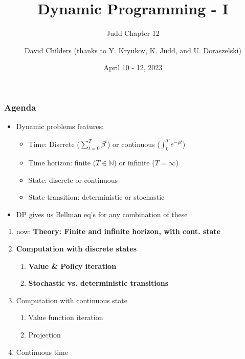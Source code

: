 \documentclass[bigger,handout]{beamer}
\begin{document}
\title[47-809: Dyn.Prog.]{Dynamic Programming - I}
\subtitle{Judd Chapter 12}
\author[David Childers]{David Childers (thanks to Y. Kryukov, K. Judd, and U. Doraszelski)}
\date[Apr 10-12]{April 10 - 12, 2023}
\maketitle



\begin{frame}%

\frametitle{Agenda}

\begin{itemize}
\item Dynamic problems features:

\begin{itemize}
\item Time: Discrete ($\sum_{t=0}^{T}\beta ^{t}$) or continuous ($%
\int_{0}^{T}e^{-\rho t}$)

\item Time horizon: finite ($T\in \mathbb{N}$) or infinite ($T=\infty $)

\item State: discrete or continuous

\item State transition: deterministic or stochastic
\end{itemize}

\item DP gives us Bellman eq's for any combination of these
\end{itemize}

\begin{enumerate}
\item now: \textbf{Theory: Finite and infinite horizon, with cont. state}

\item \textbf{Computation with discrete states}

\begin{enumerate}
\item \textbf{Value \& Policy iteration}

\item \textbf{Stochastic vs. deterministic transitions}
\end{enumerate}

\item Computation with continuous state

\begin{enumerate}
\item Value function iteration

\item Projection
\end{enumerate}

\item Continuous time
\end{enumerate}



\end{frame}%
\end{document}
